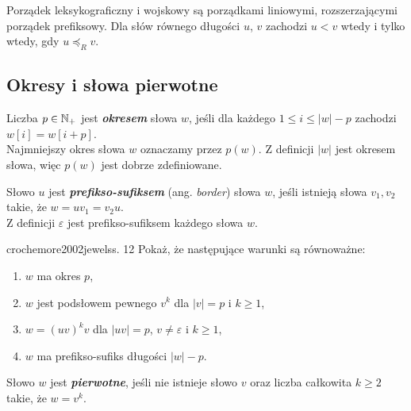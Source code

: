 \begin{corollary}{}{}
  Porządek leksykograficzny i wojskowy są porządkami liniowymi, rozszerzającymi porządek prefiksowy. Dla słów równego długości $u$, $v$ zachodzi $u < v$ wtedy i tylko wtedy, gdy $u \preceq_R v$.
\end{corollary}

\subsection{Okresy i słowa pierwotne}

\begin{definition}{}{}
  Liczba $p \in \mathbb{N}_+$ jest {\bf\textit{okresem}} słowa $w$, jeśli dla każdego $1 \le i \le |w| - p$ zachodzi $w[i] = w[i + p]$.
  \\
  Najmniejszy okres słowa $w$ oznaczamy przez $p(w)$. Z definicji $|w|$ jest okresem słowa, więc $p(w)$ jest dobrze zdefiniowane.
\end{definition}


\begin{definition}{}{}
  Słowo $u$ jest {\bf\textit{prefikso-sufiksem}} (ang. \emph{border}) słowa $w$, jeśli istnieją słowa $v_1, v_2$ takie, że $w = u v_1 = v_2 u$.
  \\
  Z definicji $\varepsilon$ jest prefikso-sufiksem każdego słowa $w$.
\end{definition}

\begin{problem}{crochemore2002jewels}{s. 12}
  Pokaż, że następujące warunki są równoważne:
  \begin{enumerate}[label=(\roman*)]
    \item $w$ ma okres $p$,
    \item $w$ jest podsłowem pewnego $v^k$ dla $|v| = p$ i $k \ge 1$,
    \item $w = (uv)^kv$ dla $|uv| = p$, $v \neq \varepsilon$ i $k \ge 1$,
    \item $w$ ma prefikso-sufiks długości $|w| - p$.
  \end{enumerate} 
\end{problem}

\begin{definition}{}{}
  Słowo $w$ jest {\bf\textit{pierwotne}}, jeśli nie istnieje słowo $v$ oraz liczba całkowita $k \ge 2$ takie, że $w = v^k$.
\end{definition}

